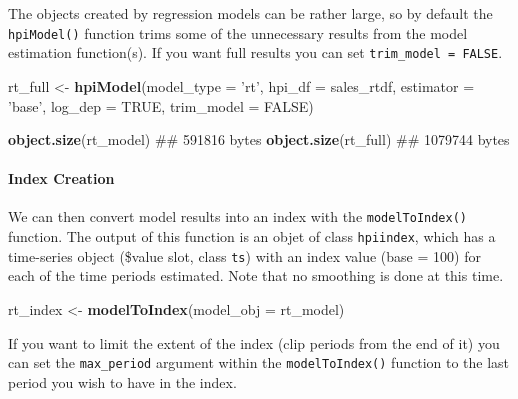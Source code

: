 \documentclass[]{article}
\newenvironment{Shaded}{\begin{snugshade}}{\end{snugshade}}
\newcommand{\KeywordTok}[1]{\textcolor[rgb]{0.13,0.29,0.53}{\textbf{#1}}}
\newcommand{\DataTypeTok}[1]{\textcolor[rgb]{0.13,0.29,0.53}{#1}}
\newcommand{\DecValTok}[1]{\textcolor[rgb]{0.00,0.00,0.81}{#1}}
\newcommand{\StringTok}[1]{\textcolor[rgb]{0.31,0.60,0.02}{#1}}
\newcommand{\OtherTok}[1]{\textcolor[rgb]{0.56,0.35,0.01}{#1}}
\newcommand{\OperatorTok}[1]{\textcolor[rgb]{0.81,0.36,0.00}{\textbf{#1}}}
\newcommand{\NormalTok}[1]{#1}
\let\oldparagraph\paragraph
\renewcommand{\paragraph}[1]{\oldparagraph{#1}\mbox{}}
\begin{document}
The objects created by regression models can be rather large, so by
default the \texttt{hpiModel()} function trims some of the unnecessary
results from the model estimation function(s). If you want full results
you can set \texttt{trim\_model\ =\ FALSE}.

\begin{Shaded}
\begin{Highlighting}[]
\NormalTok{  rt_full <-}\StringTok{ }\KeywordTok{hpiModel}\NormalTok{(}\DataTypeTok{model_type =} \StringTok{'rt'}\NormalTok{,}
                      \DataTypeTok{hpi_df =}\NormalTok{ sales_rtdf,}
                      \DataTypeTok{estimator =} \StringTok{'base'}\NormalTok{,}
                      \DataTypeTok{log_dep =} \OtherTok{TRUE}\NormalTok{,}
                      \DataTypeTok{trim_model =} \OtherTok{FALSE}\NormalTok{)}

  \KeywordTok{object.size}\NormalTok{(rt_model)}
\NormalTok{## 591816 bytes}
  \KeywordTok{object.size}\NormalTok{(rt_full)}
\NormalTok{## 1079744 bytes}
\end{Highlighting}
\end{Shaded}

\paragraph{Index Creation}\label{index-creation}

We can then convert model results into an index with the
\texttt{modelToIndex()} function. The output of this function is an
objet of class \texttt{hpiindex}, which has a time-series object
(\$value slot, class \texttt{ts}) with an index value (base = 100) for
each of the time periods estimated. Note that no smoothing is done at
this time.

\begin{Shaded}
\begin{Highlighting}[]
\NormalTok{  rt_index <-}\StringTok{ }\KeywordTok{modelToIndex}\NormalTok{(}\DataTypeTok{model_obj =}\NormalTok{ rt_model)}
\end{Highlighting}
\end{Shaded}

If you want to limit the extent of the index (clip periods from the end
of it) you can set the \texttt{max\_period} argument within the
\texttt{modelToIndex()} function to the last period you wish to have in
the index.

\begin{Shaded}
\end{Shaded}
\end{document}
